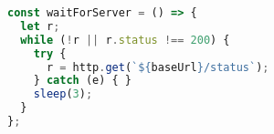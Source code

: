 \begin{lstlisting}[language=JavaScript,caption={K6 setup functions},breaklines=true,label={lst:k6Setup}]
const waitForServer = () => {
  let r;
  while (!r || r.status !== 200) {
    try {
      r = http.get(`${baseUrl}/status`);
    } catch (e) { }
    sleep(3);
  }
};
\end{lstlisting}
